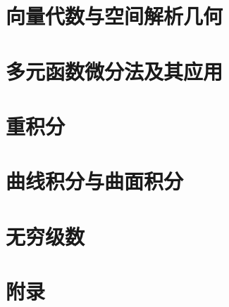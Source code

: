 \documentclass[11pt,a4paper,oneside,openany]{book}
\begin{document}

\frontmatter
\tableofcontents
\mainmatter

\setcounter{chapter}{7}
\chapter{向量代数与空间解析几何}

\chapter{多元函数微分法及其应用}

\chapter{重积分}

\chapter{曲线积分与曲面积分}

\chapter{无穷级数}


\appendix
\chapter*{附录}

\end{document}
